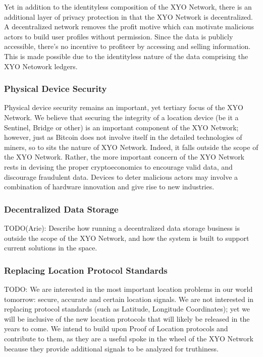 \documentclass{article}
\begin{document}
Yet in addition to the identityless composition of the XYO Network, there is an additional layer of privacy protection in that the XYO Network is decentralized. A decentralized network removes the profit motive which can motivate malicious actors to build user profiles without permission. Since the data is publicly accessible, there's no incentive to profiteer by accessing and selling information. This is made possible due to the identityless nature of the data comprising the XYO Netowork ledgers.

\subsubsection {Physical Device Security}
Physical device security remains an important, yet tertiary focus of the XYO Network. We believe that securing the integrity of a location device (be it a Sentinel, Bridge or other) is an important component of the XYO Network; however, just as Bitcoin does not involve itself in the detailed technologies of miners, so to sits the nature of XYO Network. Indeed, it falls outside the scope of the XYO Network. Rather, the more important concern of the XYO Network rests in devising the proper cryptoeconomics to encourage valid data, and discourage fraudulent data. Devices to deter malicious actors may involve a combination of hardware innovation and give rise to new industries.

\subsubsection {Decentralized Data Storage}
TODO(Arie): Describe how running a decentralized data storage business is outside the scope of the XYO Network, and how the system is built to support current solutions in the space.

\subsubsection {Replacing Location Protocol Standards}
TODO: We are interested in the most important location problems in our world tomorrow: secure, accurate and certain location signals. We are not interested in replacing protocol standards (such as Latitude, Longitude Coordinates); yet we will be inclusive of the new location protocols that will likely be released in the years to come. We intend to build upon Proof of Location protocols and contribute to them, as they are a useful spoke in the wheel of the XYO Network because they provide additional signals to be analyzed for truthiness.
\end{document}
